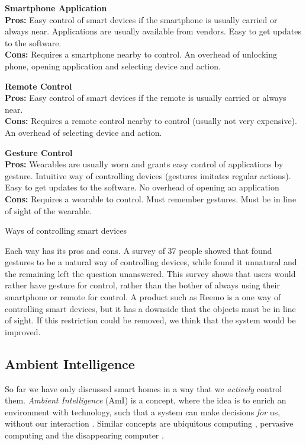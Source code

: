 \begin{table}[!htb]
    \centering
    \parbox[t][][t]{0.3\textwidth}{
        \textbf{Smartphone Application}\\
        \textbf{Pros:} Easy control of smart devices if the smartphone is usually carried or always near. 
                       Applications are usually available from vendors. 
                       Easy to get updates to the software. \\
        \textbf{Cons:} Requires a smartphone nearby to control. 
                       An overhead of unlocking phone, opening application and selecting device and action.
    }\quad
    \parbox[t][][t]{0.3\textwidth}{
        \textbf{Remote Control}\\
        \textbf{Pros:} Easy control of smart devices if the remote is usually carried or always near. \\
        \textbf{Cons:} Requires a remote control nearby to control (usually not very expensive). 
                       An overhead of selecting device and action.
    }\quad
    \parbox[t][][t]{0.3\textwidth}{
        \textbf{Gesture Control}\\
        \textbf{Pros:} Wearables are usually worn and grants easy control of applications by gesture.
                       Intuitive way of controlling devices (gestures imitates regular actions).
                       Easy to get updates to the software. 
                       No overhead of opening an application\\
        \textbf{Cons:} Requires a wearable to control. 
                       Must remember gestures.
                       Must be in line of sight of the wearable.
    }
    \caption{Ways of controlling smart devices}
    \label{tbl:smartcontrol}
\end{table}

Each way has its pros and cons. 
A survey \cite{Kela2006} of 37 people showed that  found gestures to be a natural way of controlling devices, 
while  found it unnatural and the remaining left the question unanswered. 
This survey shows that users would rather have gesture for control, 
rather than the bother of always using their smartphone or remote for control.  
A product such as Reemo is a one way of controlling smart devices, 
but it has a downside that the objects must be in line of sight. 
If this restriction could be removed, 
we think that the system would be improved.

\subsection{Ambient Intelligence}
So far we have only discussed smart homes in a way that we \emph{actively} control them. 
\emph{Ambient Intelligence} (AmI) is a concept, 
where the idea is to enrich an environment with technology, 
such that a system can make decisions \emph{for} us, without our interaction \cite{augusto2007ambient}. 
Similar concepts are ubiquitous computing \cite{Weiser:237456}, pervasive computing \cite{Saha:2003:PCP:642243.642248} and the disappearing computer \cite{Weiser:1999:CSC:329124.329126,Streitz:2005:1047671}. 

